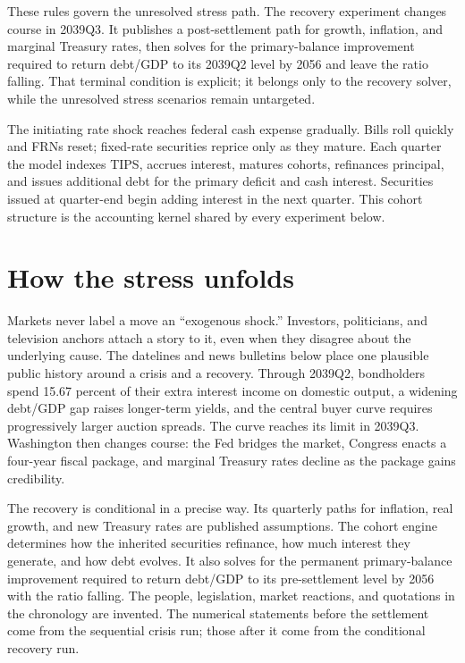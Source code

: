 \documentclass[11pt]{article}
\begin{document}
These rules govern the unresolved stress path.  The recovery experiment changes course in
2039Q3.  It publishes a post-settlement path for growth, inflation, and marginal Treasury
rates, then solves for the primary-balance improvement required to return debt/GDP to its
2039Q2 level by 2056 and leave the ratio falling.  That terminal condition is explicit; it
belongs only to the recovery solver, while the unresolved stress scenarios remain untargeted.

The initiating rate shock reaches federal cash expense gradually.  Bills roll quickly and
FRNs reset; fixed-rate securities reprice only as they mature.  Each quarter the model
indexes TIPS, accrues interest, matures cohorts, refinances principal, and issues additional
debt for the primary deficit and cash interest.  Securities issued at quarter-end begin
adding interest in the next quarter.  This cohort structure is the accounting kernel shared
by every experiment below.

\section{How the stress unfolds}

Markets never label a move an ``exogenous shock.''  Investors, politicians, and television
anchors attach a story to it, even when they disagree about the underlying cause.  The
datelines and news bulletins below place one plausible public history around a crisis and a
recovery.  Through 2039Q2, bondholders spend 15.67 percent of their extra interest income on
domestic output, a widening debt/GDP gap raises longer-term yields, and the central buyer
curve requires progressively larger auction spreads.  The curve reaches its limit in
2039Q3.  Washington then changes course: the Fed bridges the market, Congress enacts a
four-year fiscal package, and marginal Treasury rates decline as the package gains
credibility.

The recovery is conditional in a precise way.  Its quarterly paths for inflation, real
growth, and new Treasury rates are published assumptions.  The cohort engine determines how
the inherited securities refinance, how much interest they generate, and how debt evolves.
It also solves for the permanent primary-balance improvement required to return debt/GDP to
its pre-settlement level by 2056 with the ratio falling.  The people, legislation, market
reactions, and quotations in the chronology are invented.  The numerical statements before
the settlement come from the sequential crisis run; those after it come from the conditional
recovery run.
\end{document}
